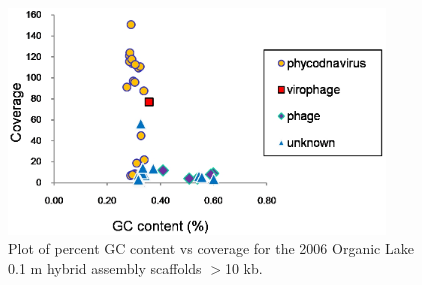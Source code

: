\begin{figure}
\centering
\includegraphics[width=100mm]{olv_figures/olv_GC_plot.jpg}
\caption[Plot of percent GC content vs coverage for the 2006 Organic Lake 0.1 \textmu{}m hybrid assembly scaffolds $>$10 kbp]{ Plot of percent GC content vs coverage for the 2006 Organic Lake 0.1 \textmu{}m hybrid assembly scaffolds $>$10 kb.
}
\label{fig:olv_GC_plot}

\end{figure}

